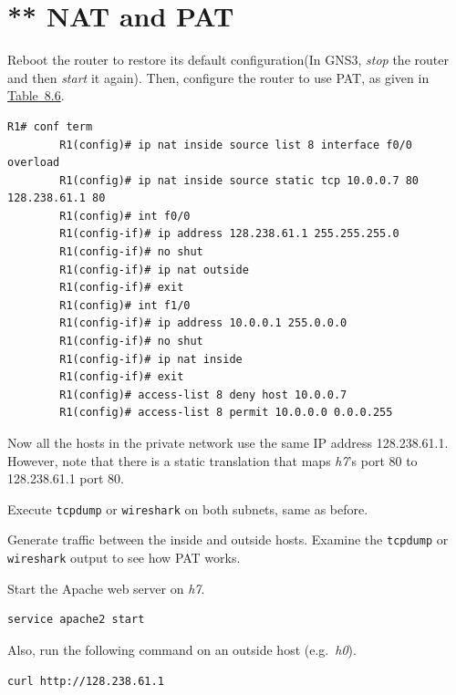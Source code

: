 \documentclass{UTNetLab}
\begin{document}
\section{** NAT and PAT}
    Reboot the router to restore its default configuration(In GNS3, \textit{stop} the router and then \textit{start} it again). Then, configure the router to use PAT, as given in \hyperref[tab:8.6]{Table~8.6}. 

    \begin{lstlisting}[language={cisco}, caption={PAT Router Configuration in \hyperref[fig:8.7]{Figure~8.7} (Table~8.6)\label{tab:8.6}}]
    	R1# conf term
    	R1(config)# ip nat inside source list 8 interface f0/0 overload
    	R1(config)# ip nat inside source static tcp 10.0.0.7 80 128.238.61.1 80
    	R1(config)# int f0/0
    	R1(config-if)# ip address 128.238.61.1 255.255.255.0
    	R1(config-if)# no shut
    	R1(config-if)# ip nat outside
    	R1(config-if)# exit
    	R1(config)# int f1/0
    	R1(config-if)# ip address 10.0.0.1 255.0.0.0
    	R1(config-if)# no shut
    	R1(config-if)# ip nat inside
    	R1(config-if)# exit
    	R1(config)# access-list 8 deny host 10.0.0.7
    	R1(config)# access-list 8 permit 10.0.0.0 0.0.0.255
    \end{lstlisting}
           
    Now all the hosts in the private network use the same IP address 128.238.61.1. However, note that there is a static translation that maps \textit{h7}’s port 80 to 128.238.61.1 port 80.

    Execute \lstinline{tcpdump} or \lstinline{wireshark} on both subnets, same as before.

    Generate traffic between the inside and outside hosts.
    Examine the \lstinline{tcpdump} or \lstinline{wireshark} output to see how PAT works.
    
    Start the Apache web server on \textit{h7}. 
    
    \begin{lstlisting}[language=bash-ext]
    service apache2 start
    \end{lstlisting}
    
     Also, run the following command on an outside host (e.g.\ \textit{h0}).
    
    \begin{lstlisting}[language=bash-ext]
    curl http://128.238.61.1
    \end{lstlisting}
\end{document}
